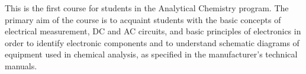 {This is the first course for students in the Analytical Chemistry program. The primary aim of the course is to acquaint students with the basic concepts of electrical measurement, DC and AC circuits, and basic principles of electronics in order to identify electronic components and to understand schematic diagrams of equipment used in chemical analysis, as specified in the manufacturer's technical manuals.}
